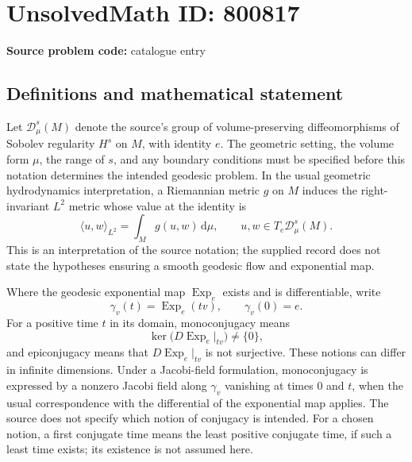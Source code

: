 \documentclass[11pt]{article}
\begin{document}
\section*{UnsolvedMath ID: 800817}
\textbf{Source problem code:} catalogue entry
\subsection{Definitions and mathematical statement}
Let \(\mathscr{D}_\mu^s(M)\) denote the source's group of volume-preserving diffeomorphisms of Sobolev regularity \(H^s\) on \(M\), with identity \(e\). The geometric setting, the volume form \(\mu\), the range of \(s\), and any boundary conditions must be specified before this notation determines the intended geodesic problem. In the usual geometric hydrodynamics interpretation, a Riemannian metric \(g\) on \(M\) induces the right-invariant \(L^2\) metric whose value at the identity is
\[
\langle u,w\rangle_{L^2}=\int_M g(u,w)\,\mathrm d\mu,
\qquad u,w\in T_e\mathscr{D}_\mu^s(M).
\]
This is an interpretation of the source notation; the supplied record does not state the hypotheses ensuring a smooth geodesic flow and exponential map.

Where the geodesic exponential map \(\operatorname{Exp}_e\) exists and is differentiable, write
\[
\gamma_v(t)=\operatorname{Exp}_e(tv),\qquad \gamma_v(0)=e.
\]
For a positive time \(t\) in its domain, monoconjugacy means
\[
\ker\bigl(D\operatorname{Exp}_e\vert_{tv}\bigr)\ne\{0\},
\]
and epiconjugacy means that \(D\operatorname{Exp}_e\vert_{tv}\) is not surjective. These notions can differ in infinite dimensions. Under a Jacobi-field formulation, monoconjugacy is expressed by a nonzero Jacobi field along \(\gamma_v\) vanishing at times \(0\) and \(t\), when the usual correspondence with the differential of the exponential map applies. The source does not specify which notion of conjugacy is intended. For a chosen notion, a first conjugate time means the least positive conjugate time, if such a least time exists; its existence is not assumed here.
\end{document}
